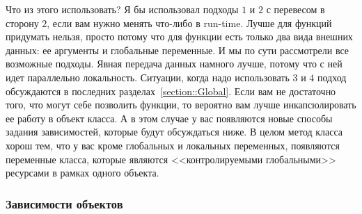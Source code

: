 Что из этого использовать?
Я бы использовал подходы $1$ и $2$ с перевесом в сторону $2$, если вам нужно менять что-либо в run-time.
Лучше для функций придумать нельзя, просто потому что для функции есть только два вида внешних данных: ее аргументы и глобальные переменные.
И мы по сути рассмотрели все возможные подходы.
Явная передача данных намного лучше, потому что с ней идет параллельно локальность.
Ситуации, когда надо использовать $3$ и $4$ подход обсуждаются в последних разделах~\ref{section::Global}.
Если вам не достаточно того, что могут себе позволить функции, то вероятно вам лучше инкапсюлировать ее работу в объект класса.
А в этом случае у вас появляются новые способы задания зависимостей, которые будут обсуждаться ниже.
В целом метод класса хорош тем, что у вас кроме глобальных и локальных переменных, появляются переменные класса, которые являются <<контролируемыми глобальными>> ресурсами в рамках одного объекта.

\subsubsection{Зависимости объектов}

